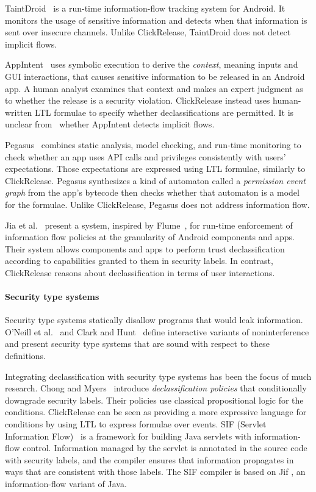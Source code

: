 \documentclass{llncs}
\newcommand{\toolname}{ClickRelease\xspace}
\begin{document}
TaintDroid~\cite{Enck:10} is a run-time information-flow tracking system
for Android.  It monitors the usage of sensitive information and detects
when that information is sent over insecure channels.
Unlike \toolname{},
TaintDroid does not detect implicit flows.

AppIntent~\cite{Yang:2013} uses symbolic execution to derive the \emph{context},
meaning inputs and GUI interactions, that causes sensitive information to be
released in an Android app. A human analyst examines that context and makes an
expert judgment as to whether the release is a security violation.  
\toolname instead uses human-written LTL formulae to specify whether 
declassifications are permitted. It is unclear from~\cite{Yang:2013} whether AppIntent detects
implicit flows.

Pegasus~\cite{Chen:13} combines static analysis, model checking,
and run-time monitoring to check whether an app uses API
calls and privileges consistently with users' expectations.
Those expectations are expressed using LTL formulae, similarly to \toolname.
Pegasus synthesizes
a kind of automaton called a \emph{permission event graph} from the
app's bytecode then checks whether that automaton is a model for the formulae.
Unlike \toolname, Pegasus does not address information flow.

Jia et al.~\cite{Jia:13} present a system, inspired by Flume~\cite{Krohn:2007},
for run-time enforcement of information flow policies at the granularity of 
Android components and apps.  Their system allows
components and apps to perform trust declassification according to 
capabilities granted to them in security labels.  In contrast,
\toolname reasons about declassification in terms of user
interactions.

\paragraph*{Security type systems}

Security type systems \cite{Volpano:1996} statically disallow programs
that would leak information. O'Neill et al.~\cite{O'Neill:06} and
Clark and Hunt~\cite{Clark:09} define interactive variants of
noninterference and present security type systems that are sound with
respect to these definitions.

Integrating declassification with security type systems has been the
focus of much research.  Chong and Myers~\cite{Chong:04} introduce
\emph{declassification policies} that conditionally downgrade security labels.
Their policies use classical propositional logic for the conditions.  
\toolname can be seen as providing a more expressive language for
conditions by using LTL to express formulae over events.  
%
SIF (Servlet Information Flow)~\cite{Chong:07} is a framework for
building Java servlets with information-flow control.  Information
managed by the servlet is annotated in the source code with security
labels, and the compiler ensures that information propagates in ways
that are consistent with those labels.  The SIF compiler is based on
Jif \cite{Myers:1999}, an information-flow variant of Java.
\end{document}

